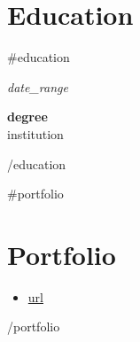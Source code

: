 \documentclass[10pt, a4paper]{article}
\begin{document}
\section{Education}

{{#education}}
\noindent
\begin{minipage}[t]{2.8cm}\raggedright\small\color{lightgray}\textit{ {{date_range}} }\end{minipage}%
\begin{minipage}[t]{\dimexpr\linewidth-2.8cm\relax}\raggedright
  \textbf{ {{degree}} }\\
  {{institution}}
\end{minipage}
\vspace{0.5em}
{{/education}}

{{#portfolio}}
\section{Portfolio}

\begin{itemize}
  \item \href{ {{url}} }{\textcolor{navyblue}{ {{url}} }}
\end{itemize}
{{/portfolio}}
\end{document}
